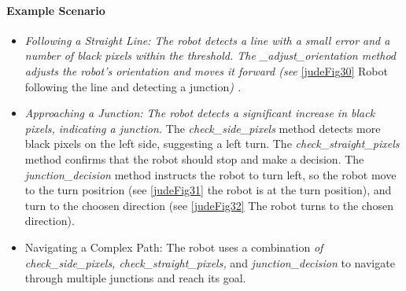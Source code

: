 \documentclass[a4paper,12pt]{extreport}
\begin{document}
\paragraph{Example Scenario}

\begin{itemize}
\item
  \emph{Following a Straight Line: The robot detects a line with a small
  error and a number of black pixels within the threshold. The
  \_adjust\_orientation method adjusts the robot's orientation and moves
  it forward (see} \cref{judeFig30} Robot following the line and detecting a
  junction\emph{) .}
\item
  \emph{Approaching a Junction: The robot detects a significant increase
  in black pixels, indicating a junction.} The
  \emph{check\_side\_pixels} method detects more black pixels on the
  left side, suggesting a left turn. The \emph{check\_straight\_pixels}
  method confirms that the robot should stop and make a decision. The
  \emph{junction\_decision} method instructs the robot to turn left, so
  the robot move to the turn positrion (see \cref{judeFig31} the robot is at
  the turn position), and turn to the choosen direction (see \cref{judeFig32}
  The robot turns to the chosen direction).
\item
  Navigating a Complex Path: The robot uses a combination \emph{of
  check\_side\_pixels, check\_straight\_pixels,} and
  \emph{junction\_decision} to navigate through multiple junctions and
  reach its goal.
\end{itemize}
\end{document}
